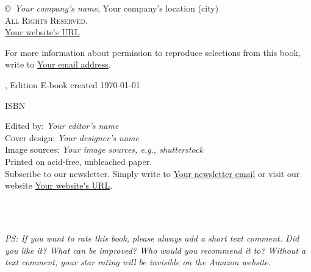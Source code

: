 \thispagestyle{empty}
\begin{center}

\copyright~\the\year \textit{Your company's name}, Your company's location (city)\\
\textsc{All Rights Reserved.}\\
\url{Your website's URL}

For more information about permission to reproduce selections from this book, write to \url{Your email address}.

\ifxetex
	\the\year, Edition
\else
	E-book created \today
\fi

\ifxetex
	\textsc{ISBN}
\fi


Edited by: \emph{Your editor's name}\\
Cover design: \emph{Your designer's name}\\
Image sources: \emph{Your image sources, e.g., shutterstock}\\


\ifxetex
	Printed on acid\hyp{}free, unbleached paper.
\fi
~\\	

Subscribe to our newsletter. Simply write to \url{Your newsletter email} or visit our website \url{Your website's URL}.

\ifxetex
\else
	~\\
	~\\\par	
	\textit{PS: If you want to rate this book, please always add a short text comment. Did you like it? What can be improved? Who would you recommend it to? Without a text comment, your star rating will be invisible on the Amazon website.}
	\myrule
\fi
	
\end{center}



